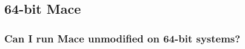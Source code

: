 \begin{comment}
\subsection{Priorities for routing services}
\label{faq:priority}

\subsubsection*{Does the \literal{TCP} Service actually \emph{do anything} with the priority information
provided in the API call?  Why is it part of the call?}

No.  The \literal{TCP} service does not use the priority parameter from the API call.
The priority parameter is part of the \literal{TCP} service route because it is part of
the \classname{RouteServiceClass} API.  And it is part of the
\classname{RouteServiceClass} API because it represents information a routing
service \emph{might} use to determine how to handle the message.  There are no
requirements for \emph{how} a route service treats different priority values,
but they are there to make it possible.  It is therefore recommended that
service designers use appropriate priority values to express their desires to
the route service they are using.

For examples of services which do or will use the priority value, look to the
\literal{Pastry} service.  It does not make [much] sense to create multiple \literal{Pastry}
services the way it does with \literal{TCP} services due to the overhead of maintaining a
\literal{Pastry} overlay.  However, it is still desirable to have a way to put messages
in different queues.  In fact, the \literal{Pastry} implementation maps priority values
to different \literal{TCP} instances it uses for routing data.  Another service which
would use the priority value if its ever written is a priority-queue reliable
transport service based over \literal{UDP}.  This service will always focus on sending
the message with the most priority, which may cause it to displace lower
priority messages.
\end{comment}

\subsection{64-bit Mace}

\subsubsection*{Can I run Mace unmodified on 64-bit systems?}

